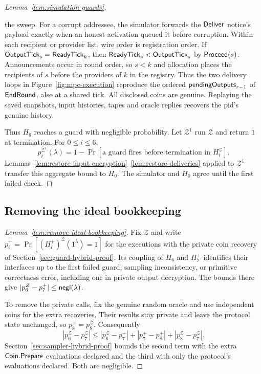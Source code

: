 \begin{proof}[Lemma~\ref{lem:simulation-guards}]
\begin{description}
 the sweep.  For a corrupt addressee, the simulator forwards the
 $\mathsf{Deliver}$ notice's payload exactly when an honest activation queued
 it before corruption.  Within each recipient or provider list,
 wire order is registration order.  If $\mathsf{OutputTick}_s=\mathsf{ReadyTick}_k$,
 then $\mathsf{ReadyTick}_s<\mathsf{OutputTick}_s$ by $\mathsf{Proceed}(s)$.  Announcements
 occur in round order, so $s<k$ and allocation places the recipients
 of $s$ before the providers of $k$ in the registry.
 Thus the two delivery loops in Figure~\ref{fig:mpc-execution} reproduce
 the ordered $\mathsf{pendingOutputs}_{r-1}$ of $\mathsf{EndRound}$, also at a shared tick.
 All disclosed coins are genuine.  Replaying the saved snapshots, input
 histories, tapes and oracle replies recovers the pid's genuine history.
\end{description}

Thus $H_6$ reaches a guard with negligible probability.  Let
$\mathcal Z^1$ run $\mathcal Z$ and return $1$ at termination.  For
$0\leq i\leq6$,
\[
 p_i^{\mathcal Z^1}(\lambda)
 =1-\Pr[\text{a guard fires before termination in }H_i^{\mathcal Z}].
\]
Lemmas~\ref{lem:restore-input-encryption}--\ref{lem:restore-deliveries}
applied to $\mathcal Z^1$ transfer this aggregate bound to $H_0$.
The simulator and $H_0$ agree until the first failed check.
\end{proof}

\subsection{Removing the ideal bookkeeping}
\label{sec:endpoint-hybrid-proof}
\begin{proof}[Lemma~\ref{lem:remove-ideal-bookkeeping}]
Fix $\mathcal Z$ and write $p_i^+=\Pr[(H_i^+)^{\mathcal Z}(1^\lambda)=1]$
for the executions with the private coin recovery of
Section~\ref{sec:guard-hybrid-proof}.  Its coupling of $H_6$ and $H_7^+$
identifies their interfaces up to the first failed guard, sampling
inconsistency, or primitive correctness error, including one in private
output decryption.
The bounds there give $|p_6^{\mathcal Z}-p_7^+|\leq\mathop{\mathsf{negl}}(\lambda)$.

To remove the private calls, fix the genuine random oracle and use
independent coins for the extra recoveries.  Their results stay private
and leave the protocol state unchanged, so $p_8^+=p_8^{\mathcal Z}$.
Consequently
\[
 |p_6^{\mathcal Z}-p_7^{\mathcal Z}|
 \leq |p_6^{\mathcal Z}-p_7^+|
      +|p_7^+-p_8^+|
      +|p_8^{\mathcal Z}-p_7^{\mathcal Z}|.
\]
Section~\ref{sec:sampler-hybrid-proof} bounds the second term with the
extra $\mathsf{Coin}.\mathsf{Prepare}$ evaluations declared and the third with only
the protocol's evaluations declared.  Both are negligible.
\end{proof}
